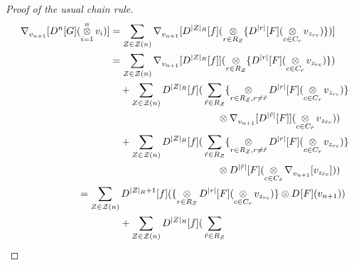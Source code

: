 \documentclass[11pt]{article}
\theoremstyle{remark}
\begin{document}
\begin{proof}[Proof of the usual chain rule]
\begin{align*}
\ensuremath{{{\nabla}}_{v_{n+1}}^{}{[\ensuremath{D^{n} [{G}] ({\mathop{\otimes}_{i=1}^n v_i}) }]}}
& = \sum_{\ensuremath{Z} \in \ensuremath{\mathcal{\ensuremath{Z}}}(n)} 
\ensuremath{{{\nabla}}_{v_{n+1}}^{}{[\ensuremath{D^{ |\ensuremath{Z}|_R } [{f}] ({ \mathop{\otimes}_{r \in R_{\ensuremath{Z}}}
\{\ensuremath{D^{|r|} [{F}] {} } 
( \mathop{\otimes}_{c \in C_{r}} v_{\ensuremath{z}_{rc}} )\}}) } ]}} \\
&=
\sum_{\ensuremath{Z} \in \ensuremath{\mathcal{\ensuremath{Z}}}(n)} 
\ensuremath{{{\nabla}}_{v_{n+1}}^{}{[\ensuremath{D^{ |\ensuremath{Z}|_R } [{f}] {]} }}}
{( \mathop{\otimes}_{r \in R_{\ensuremath{Z}}} \{\ensuremath{D^{ |r| } [{F}] {} }
( \mathop{\otimes}_{c \in C_{r}} v_{\ensuremath{z}_{rc}} )\})} \\
&\quad+
\sum_{\ensuremath{Z} \in \ensuremath{\mathcal{\ensuremath{Z}}}(n)} 
\ensuremath{D^{ |\ensuremath{Z}|_R } [{f}] {(} }\sum_{\tilde r \in R_{\ensuremath{Z}}} 
 \{\mathop{\otimes}_{r \in R_{\ensuremath{Z}}, r\neq \tilde r} 
\ensuremath{D^{|r|} [{F}] {} }
(\mathop{\otimes}_{c \in C_{r}} v_{\ensuremath{z}_{rc}} ) \} 
\\& \hspace{1.5in}\otimes
\ensuremath{{{\nabla}}_{v_{n+1}}^{}{[  
\ensuremath{D^{|\tilde r|} [{F}] {} }]}}
(\mathop{\otimes}_{c \in C_{\tilde r}} v_{\ensuremath{z}_{\tilde rc}} ) ) \\
&\quad+
\sum_{\ensuremath{Z} \in \ensuremath{\mathcal{\ensuremath{Z}}}(n)} 
\ensuremath{D^{ |\ensuremath{Z}|_R } [{f}] {(} }\sum_{\tilde r \in R_{\ensuremath{Z}}} 
 \{\mathop{\otimes}_{r \in R_{\ensuremath{Z}}, r\neq \tilde r} 
\ensuremath{D^{|r|} [{F}] {} }
(\mathop{\otimes}_{c \in C_{r}} v_{\ensuremath{z}_{rc}} ) \} 
\\& \hspace{1.5in}\otimes  
\ensuremath{D^{|\tilde r|} [{F}] {} }
(\mathop{\otimes}_{c \in C_{\tilde r}} \ensuremath{{{\nabla}}_{v_{n+1}}^{}{[
  v_{\ensuremath{z}_{\tilde{r}c}} ]}}) ) \\ 
&\hspace{-.45in}=
\sum_{\ensuremath{Z} \in \ensuremath{\mathcal{\ensuremath{Z}}}(n)} 
\ensuremath{D^{ |\ensuremath{Z}|_R +1} [{f}] {(} }\{ \mathop{\otimes}_{r \in R_{\ensuremath{Z}}} \ensuremath{D^{ |r| } [{F}] {} }
( \mathop{\otimes}_{c \in C_{r}} v_{\ensuremath{z}_{rc}} )\} \otimes \ensuremath{D^{} [{F}] ({v_{n+1}}) }) \\
&\quad+
\sum_{\ensuremath{Z} \in \ensuremath{\mathcal{\ensuremath{Z}}}(n)} 
\ensuremath{D^{ |\ensuremath{Z}|_R } [{f}] {(} }\sum_{\tilde r \in R_{\ensuremath{Z}}} 

\end{align*}
\end{proof}
\end{document}
